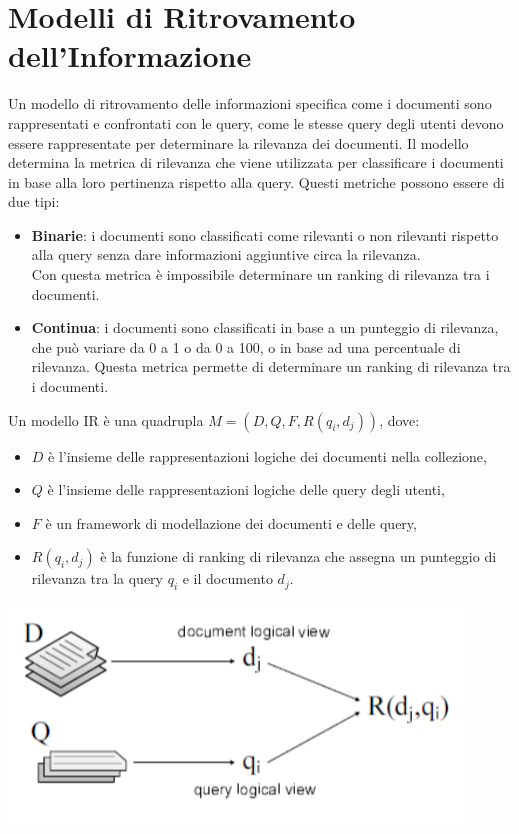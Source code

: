 \documentclass{report}
\begin{document}
	\section{Modelli di Ritrovamento dell'Informazione}
	Un modello di ritrovamento delle informazioni specifica come i documenti sono rappresentati e confrontati con le query, come le stesse query degli utenti devono essere rappresentate per determinare la rilevanza dei documenti. Il modello determina la metrica di rilevanza che viene utilizzata per classificare i documenti in base alla loro pertinenza rispetto alla query. Questi metriche possono essere di due tipi:
	\begin{itemize}
		\item \textbf{Binarie}: i documenti sono classificati come rilevanti o non rilevanti rispetto alla query senza dare informazioni aggiuntive circa la rilevanza. \\Con questa metrica è impossibile determinare un ranking di rilevanza tra i documenti.
		\item \textbf{Continua}: i documenti sono classificati in base a un punteggio di rilevanza, che può variare da 0 a 1 o da 0 a 100, o in base ad una percentuale di rilevanza. Questa metrica permette di determinare un ranking di rilevanza tra i documenti.
	\end{itemize}

	Un modello IR è una quadrupla $M = (D, Q, F, R(q_i, d_j))$, dove:
	\begin{itemize}
		\item $D$ è l'insieme delle rappresentazioni logiche dei documenti nella collezione,
		\item $Q$ è l'insieme delle rappresentazioni logiche delle query degli utenti,
		\item $F$ è un framework di modellazione dei documenti e delle query,
		\item $R(q_i, d_j)$ è la funzione di ranking di rilevanza che assegna un punteggio di rilevanza tra la query $q_i$ e il documento $d_j$.
	\end{itemize}
	\begin{center}
		\includegraphics[scale=0.6]{assets/irmodel.png}
	\end{center}
	
\end{document}
